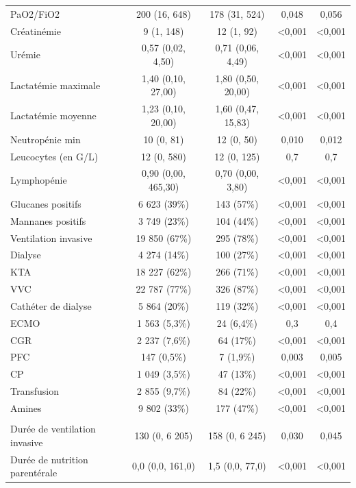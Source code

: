 \documentclass[
  french,
  letterpaper,
  DIV=11,
  numbers=noendperiod,
  justified]{scrartcl}
\begin{document}
\begin{table}
\begin{tabular*}{\linewidth}{@{\extracolsep{\fill}}lcccc}
PaO2/FiO2  & 200 (16, 648) & 178 (31, 524) & 0,048 & 0,056 \\
Créatinémie  & 9 (1, 148) & 12 (1, 92) & <0,001 & <0,001 \\
Urémie  & 0,57 (0,02, 4,50) & 0,71 (0,06, 4,49) & <0,001 & <0,001 \\
Lactatémie maximale & 1,40 (0,10, 27,00) & 1,80 (0,50, 20,00) & <0,001 & <0,001 \\
Lactatémie moyenne  & 1,23 (0,10, 20,00) & 1,60 (0,47, 15,83) & <0,001 & <0,001 \\
Neutropénie min  & 10 (0, 81) & 12 (0, 50) & 0,010 & 0,012 \\
Leucocytes (en G/L) & 12 (0, 580) & 12 (0, 125) & 0,7 & 0,7 \\
Lymphopénie  & 0,90 (0,00, 465,30) & 0,70 (0,00, 3,80) & <0,001 & <0,001 \\
Glucanes positifs & 6 623 (39\%) & 143 (57\%) & <0,001 & <0,001 \\
Mannanes positifs & 3 749 (23\%) & 104 (44\%) & <0,001 & <0,001 \\
Ventilation invasive  & 19 850 (67\%) & 295 (78\%) & <0,001 & <0,001 \\
Dialyse  & 4 274 (14\%) & 100 (27\%) & <0,001 & <0,001 \\
KTA  & 18 227 (62\%) & 266 (71\%) & <0,001 & <0,001 \\
VVC  & 22 787 (77\%) & 326 (87\%) & <0,001 & <0,001 \\
Cathéter de dialyse  & 5 864 (20\%) & 119 (32\%) & <0,001 & <0,001 \\
ECMO  & 1 563 (5,3\%) & 24 (6,4\%) & 0,3 & 0,4 \\
CGR  & 2 237 (7,6\%) & 64 (17\%) & <0,001 & <0,001 \\
PFC  & 147 (0,5\%) & 7 (1,9\%) & 0,003 & 0,005 \\
CP  & 1 049 (3,5\%) & 47 (13\%) & <0,001 & <0,001 \\
Transfusion  & 2 855 (9,7\%) & 84 (22\%) & <0,001 & <0,001 \\
Amines  & 9 802 (33\%) & 177 (47\%) & <0,001 & <0,001 \\
\midrule\addlinespace[2.5pt]
\multicolumn{5}{l}{{\bfseries Données au cours de l'hospitalisation préalablement à l'hémoculture}} \\[2.5pt]
\midrule\addlinespace[2.5pt]
Durée de ventilation invasive  & 130 (0, 6 205) & 158 (0, 6 245) & 0,030 & 0,045 \\
Durée de nutrition parentérale  & 0,0 (0,0, 161,0) & 1,5 (0,0, 77,0) & <0,001 & <0,001 \\

\end{tabular*}
\end{table}
\end{document}
